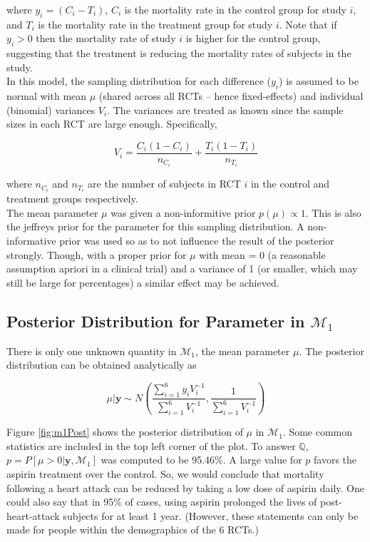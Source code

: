 \documentclass{../../tex_template/asaproc}
\newcommand{\p}[1]{\left(#1\right)}
\newcommand{\bk}[1]{\left[#1\right]}
\newcommand{\M}{\mathcal{M}}
\newcommand{\Q}{\mathbb{Q}}
\begin{document}
where $y_i = (C_i - T_i)$, $C_i$ is the mortality rate in the control group for
study $i$, and $T_i$ is the mortality rate in the treatment group for study
$i$. Note that if $y_i > 0$ then the mortality rate of study $i$ is higher
for the control group, suggesting that the treatment is reducing the
mortality rates of subjects in the study.\\

In this model, the sampling distribution for each difference ($y_i$) is assumed
to be normal with mean $\mu$ (shared across all RCTs -- hence fixed-effects)
and individual (binomial) variances $V_i$. The variances are treated as known
since the sample sizes in each RCT are large enough. Specifically,

$$
V_i = \frac{C_i(1-C_i)}{n_{C_i}} + \frac{T_i(1-T_i)}{n_{T_i}}
$$

where $n_{C_i}$ and $n_{T_i}$ are the number of subjects in RCT $i$ in the
control and treatment groups respectively.\\

The mean parameter $\mu$ was given a non-informitive prior $p(\mu) \propto 1$.
This is also the jeffreys prior for the parameter for this sampling
distribution. A non-informative prior was used so as to not influence the
result of the posterior strongly. Though, with a proper prior for $\mu$ with
mean = 0 (a reasonable assumption apriori in a clinical trial) and a variance
of 1 (or smaller, which may still be large for percentages) a similar effect may
be achieved.\\

\subsection{Posterior Distribution for Parameter in $\M_1$}
There is only one unknown quantity in $\M_1$, the mean parameter $\mu$. 
The posterior distribution can be obtained analytically as

$$
\mu | \bm{y} \sim N\p{\frac{\sum_{i=1}^6 y_iV_i^{-1}}{\sum_{i=1}^6V_i^{-1}},
                      \frac{1}{\sum_{i=1}^6V_i^{-1}}}
$$

Figure \ref{fig:m1Post} shows the posterior distribution of $\mu$ in $\M_1$.
Some common statistics are included in the top left corner of the plot. To
answer $\Q$, $p=P\bk{\mu>0|\bm{y},\M_1}$ was computed to be 95.46\%.  A large
value for $p$ favors the aspirin treatment over the control. So, we would
conclude that mortality following a heart attack can be reduced by taking a low
dose of aspirin daily. One could also say that in 95\% of cases, using aspirin
prolonged the lives of post-heart-attack subjects for at least 1 year. (However,
these statements can only be made for people within the demographics of the 6
RCTs.)
\end{document}
